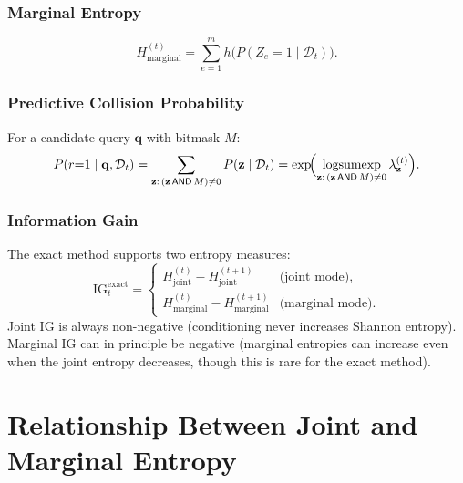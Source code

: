 \documentclass[11pt]{article}
\DeclareMathOperator{\logsumexp}{logsumexp}
\begin{document}
\subsubsection{Marginal Entropy}
\begin{equation}
  H_{\text{marginal}}^{(t)} = \sum_{e=1}^{m} h\!\bigl(P(Z_e = 1 \mid \mathcal{D}_t)\bigr).
  \label{eq:marginal-entropy}
\end{equation}

\subsubsection{Predictive Collision Probability}
For a candidate query $\mathbf{q}$ with bitmask $M$:
\begin{equation}
  P(r{=}1 \mid \mathbf{q}, \mathcal{D}_t)
  = \sum_{\mathbf{z}:\, (\mathbf{z}\,\mathsf{AND}\, M) \neq 0} P(\mathbf{z} \mid \mathcal{D}_t)
  = \exp\!\Bigl(\logsumexp_{\mathbf{z}:\, (\mathbf{z}\,\mathsf{AND}\, M) \neq 0} \lambda_{\mathbf{z}}^{(t)}\Bigr).
  \label{eq:pred-collision}
\end{equation}

\subsubsection{Information Gain}

The exact method supports two entropy measures:
\begin{equation}
  \mathrm{IG}_t^{\text{exact}} =
  \begin{cases}
    H_{\text{joint}}^{(t)} - H_{\text{joint}}^{(t+1)} & \text{(joint mode)}, \\
    H_{\text{marginal}}^{(t)} - H_{\text{marginal}}^{(t+1)} & \text{(marginal mode)}.
  \end{cases}
  \label{eq:exact-ig}
\end{equation}
Joint IG is always non-negative (conditioning never increases Shannon
entropy).  Marginal IG can in principle be negative (marginal entropies
can increase even when the joint entropy decreases, though this is rare
for the exact method).

\section{Relationship Between Joint and Marginal Entropy}
\label{sec:joint-vs-marginal}
\end{document}
